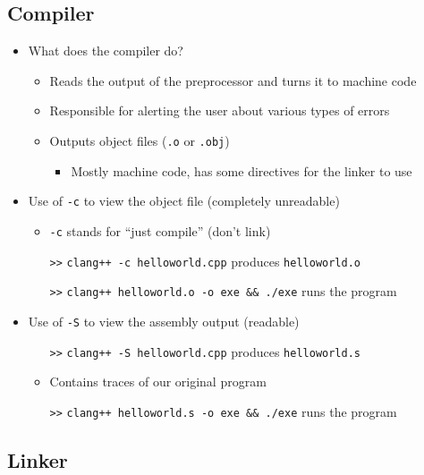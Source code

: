 \documentclass{article}
\begin{document}
\subsection{Compiler}

\begin{itemize}
	\item What does the compiler do? \begin{itemize}
		\item Reads the output of the preprocessor and turns it to machine code
		\item Responsible for alerting the user about various types of errors
		\item Outputs object files (\texttt{.o} or \texttt{.obj}) \begin{itemize}
			\item Mostly machine code, has some directives for the linker to use
		\end{itemize}
	\end{itemize}
	\item Use of \texttt{-c} to view the object file (completely unreadable)\begin{itemize}
		\item \texttt{-c} stands for ``just compile'' (don't link)
		\item[\texttt{>>}] \texttt{clang++ -c helloworld.cpp} produces \texttt{helloworld.o}
		\item[\texttt{>>}] \texttt{clang++ helloworld.o -o exe \&\& ./exe} runs the program
	\end{itemize}
	\item Use of \texttt{-S} to view the assembly output (readable)\begin{itemize}
		\item[\texttt{>>}] \texttt{clang++ -S helloworld.cpp} produces \texttt{helloworld.s}
		\item Contains traces of our original program
		\item[\texttt{>>}] \texttt{clang++ helloworld.s -o exe \&\& ./exe} runs the program
	\end{itemize}
\end{itemize}

\subsection{Linker}
\end{document}
